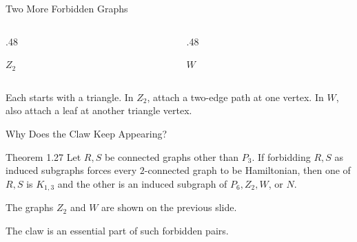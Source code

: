 \documentclass[aspectratio=169,11pt]{beamer}
\begin{document}
\begin{frame}{Two More Forbidden Graphs}
\large
\begin{columns}[c,onlytextwidth]\begin{column}{.48\textwidth}\begin{center}\end{center}\begin{center}$Z_2$\end{center}\end{column}\begin{column}{.48\textwidth}\begin{center}\end{center}\begin{center}$W$\end{center}\end{column}\end{columns}\medskip Each starts with a triangle. In $Z_2$, attach a two-edge path at one vertex. In $W$, also attach a leaf at another triangle vertex.
\end{frame}

\begin{frame}{Why Does the Claw Keep Appearing?}
\large
\begin{block}{Theorem 1.27}
Let $R,S$ be connected graphs other than $P_3$. If forbidding $R,S$ as induced subgraphs forces every $2$-connected graph to be Hamiltonian, then one of $R,S$ is $K_{1,3}$ and the other is an induced subgraph of $P_6,Z_2,W$, or $N$.
\end{block}
\medskip The graphs $Z_2$ and $W$ are shown on the previous slide.\par\medskip The claw is an essential part of such forbidden pairs.
\end{frame}
\end{document}

